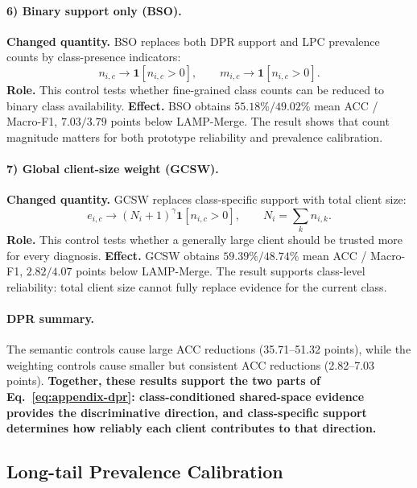 \documentclass[letterpaper]{article}
\theoremstyle{definition}
\theoremstyle{plain}
\begin{document}
\paragraph{6) Binary support only (BSO).}
\textbf{Changed quantity.} BSO replaces both DPR support and LPC prevalence counts by class-presence indicators:
\begin{equation}
n_{i,c}\longrightarrow\mathbf{1}[n_{i,c}>0],
\qquad
m_{i,c}\longrightarrow\mathbf{1}[n_{i,c}>0].
\end{equation}
\textbf{Role.} This control tests whether fine-grained class counts can be reduced to binary class availability. \textbf{Effect.} BSO obtains \(55.18\% / 49.02\%\) mean ACC / Macro-F1, \(7.03 / 3.79\) points below LAMP-Merge. The result shows that count magnitude matters for both prototype reliability and prevalence calibration.

\paragraph{7) Global client-size weight (GCSW).}
\textbf{Changed quantity.} GCSW replaces class-specific support with total client size:
\begin{equation}
e_{i,c}\longrightarrow(N_i+1)^\gamma\mathbf{1}[n_{i,c}>0],
\qquad
N_i=\sum_k n_{i,k}.
\end{equation}
\textbf{Role.} This control tests whether a generally large client should be trusted more for every diagnosis. \textbf{Effect.} GCSW obtains \(59.39\% / 48.74\%\) mean ACC / Macro-F1, \(2.82 / 4.07\) points below LAMP-Merge. The result supports class-level reliability: total client size cannot fully replace evidence for the current class.

\paragraph{DPR summary.} The semantic controls cause large ACC reductions (35.71--51.32 points), while the weighting controls cause smaller but consistent ACC reductions (2.82--7.03 points). \textbf{Together, these results support the two parts of Eq.~\ref{eq:appendix-dpr}: class-conditioned shared-space evidence provides the discriminative direction, and class-specific support determines how reliably each client contributes to that direction.}

\subsection{Long-tail Prevalence Calibration}
\end{document}
